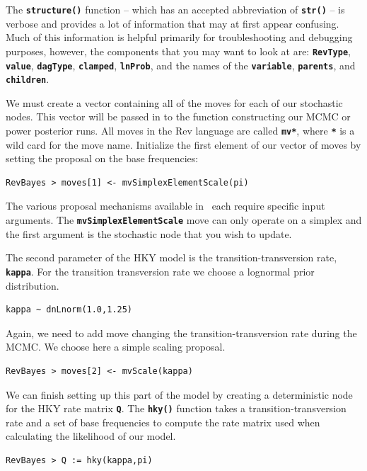 \documentclass[11pt]{article}
\newcommand{\cl}[1]{{\texttt{\textbf{#1}}}}
\begin{document}
The \cl{structure()} function -- which has an accepted abbreviation of \cl{str()} -- is verbose and provides a lot of information that may at first appear confusing. 
Much of this information is helpful primarily for troubleshooting and debugging purposes, however, the components that you may want to look at are: \cl{RevType}, \cl{value}, \cl{dagType}, \cl{clamped}, \cl{lnProb}, and the names of the \cl{variable}, \cl{parents}, and \cl{children}.

We must create a vector containing all of the moves for each of our stochastic nodes. 
This vector will be passed in to the function constructing our MCMC or power posterior runs.
All moves in the Rev language are called \cl{mv*}, where \cl{*} is a wild card for the move name. 
Initialize the first element of our vector of moves by setting the proposal on the base frequencies:

{\tt\small \begin{snugshade*}
\begin{lstlisting}
RevBayes > moves[1] <- mvSimplexElementScale(pi) 
\end{lstlisting}
\end{snugshade*}}


The various proposal mechanisms available in \RevBayes~each require specific input arguments. 
The \cl{mvSimplexElementScale} move can only operate on a simplex and the first argument is the stochastic node that you wish to update. 


The second parameter of the HKY model is the transition-transversion rate, \cl{kappa}.
For the transition transversion rate we choose a lognormal prior distribution.
{\tt\small \begin{snugshade*}
\begin{lstlisting}
kappa ~ dnLnorm(1.0,1.25)
\end{lstlisting}
\end{snugshade*}}

Again, we need to add move changing the transition-transversion rate during the MCMC.
We choose here a simple scaling proposal.
{\tt\small \begin{snugshade*}
\begin{lstlisting}
RevBayes > moves[2] <- mvScale(kappa) 
\end{lstlisting}
\end{snugshade*}}


We can finish setting up this part of the model by creating a deterministic node for the HKY rate matrix \cl{Q}. 
The \cl{hky()} function takes a transition-transversion rate and a set of base frequencies to compute the rate matrix used when calculating the likelihood of our model.
{\tt \begin{snugshade*}
\begin{lstlisting}
RevBayes > Q := hky(kappa,pi)
\end{lstlisting}
\end{snugshade*}}
\end{document}

